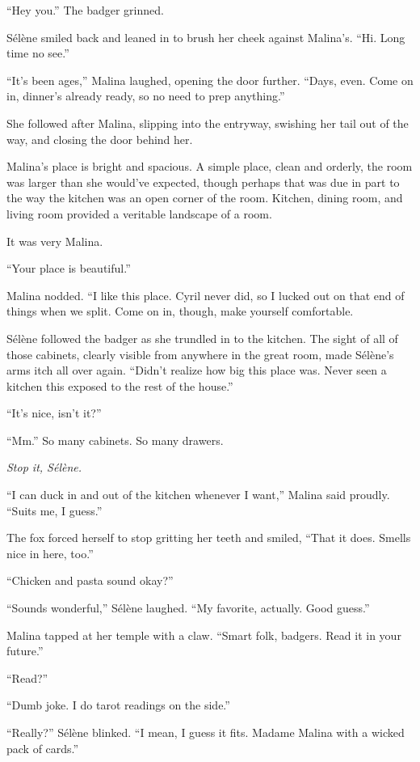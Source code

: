 ``Hey you.'' The badger grinned.

Sélène smiled back and leaned in to brush her cheek against Malina's. ``Hi. Long time no see.''

``It's been ages,'' Malina laughed, opening the door further. ``Days, even. Come on in, dinner's already ready, so no need to prep anything.''

She followed after Malina, slipping into the entryway, swishing her tail out of the way, and closing the door behind her.

Malina's place is bright and spacious. A simple place, clean and orderly, the room was larger than she would've expected, though perhaps that was due in part to the way the kitchen was an open corner of the room. Kitchen, dining room, and living room provided a veritable landscape of a room.

It was very Malina.

``Your place is beautiful.''

Malina nodded. ``I like this place. Cyril never did, so I lucked out on that end of things when we split. Come on in, though, make yourself comfortable.

Sélène followed the badger as she trundled in to the kitchen. The sight of all of those cabinets, clearly visible from anywhere in the great room, made Sélène's arms itch all over again. ``Didn't realize how big this place was. Never seen a kitchen this exposed to the rest of the house.''

``It's nice, isn't it?''

``Mm.'' So many cabinets. So many drawers.

\emph{Stop it, Sélène.}

``I can duck in and out of the kitchen whenever I want,'' Malina said proudly. ``Suits me, I guess.''

The fox forced herself to stop gritting her teeth and smiled, ``That it does. Smells nice in here, too.''

``Chicken and pasta sound okay?''

``Sounds wonderful,'' Sélène laughed. ``My favorite, actually. Good guess.''

Malina tapped at her temple with a claw. ``Smart folk, badgers. Read it in your future.''

``Read?''

``Dumb joke. I do tarot readings on the side.''

``Really?'' Sélène blinked. ``I mean, I guess it fits. Madame Malina with a wicked pack of cards.''


